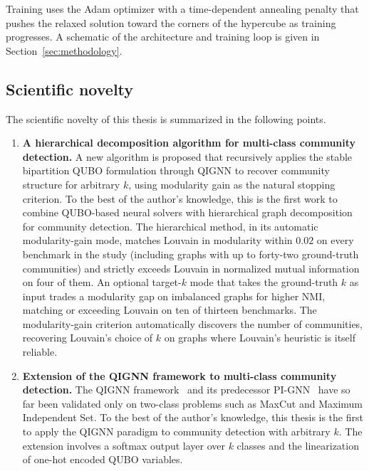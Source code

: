 Training uses the Adam optimizer with a time-dependent annealing
penalty that pushes the relaxed solution toward the corners of the
hypercube as training progresses. A schematic of the architecture
and training loop is given in Section~\ref{sec:methodology}.


\subsection{Scientific novelty}
\label{sec:novelty}

The scientific novelty of this thesis is summarized in the
following points.

\begin{enumerate}
    \item \textbf{A hierarchical decomposition algorithm for
    multi-class community detection.} A new algorithm is proposed
    that recursively applies the stable bipartition QUBO
    formulation through QIGNN to recover community structure for
    arbitrary $k$, using modularity gain as the natural stopping
    criterion. To the best of the author's knowledge, this is the
    first work to combine QUBO-based neural solvers with
    hierarchical graph decomposition for community detection. The
    hierarchical method, in its automatic modularity-gain mode,
    matches Louvain in modularity within $0.02$ on every benchmark
    in the study (including graphs with up to forty-two
    ground-truth communities) and strictly exceeds Louvain in
    normalized mutual information on four of them. An optional
    target-$k$ mode that takes the ground-truth $k$ as input
    trades a modularity gap on imbalanced graphs for higher NMI,
    matching or exceeding Louvain on ten of thirteen benchmarks.
    The modularity-gain criterion automatically discovers the
    number of communities, recovering Louvain's choice of $k$
    on graphs where Louvain's heuristic is itself reliable.

    \item \textbf{Extension of the QIGNN framework to multi-class
    community detection.} The QIGNN
    framework~\cite{qignn2026} and its predecessor
    PI-GNN~\cite{schuetz2022combinatorial} have so far been
    validated only on two-class problems such as MaxCut and Maximum
    Independent Set. To the best of the author's knowledge, this
    thesis is the first to apply the QIGNN paradigm to community
    detection with arbitrary $k$. The extension involves a softmax
    output layer over $k$ classes and the linearization of one-hot
    encoded QUBO variables.


\end{enumerate}
